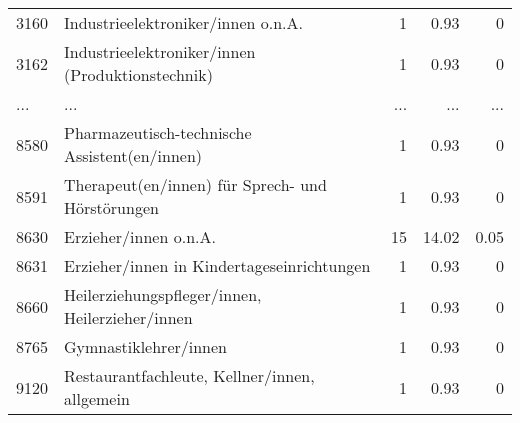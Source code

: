 \begin{longtable}{lXrrr}
        3160 & \multicolumn{1}{X}{Industrieelektroniker/innen o.n.A.} & %
          \num{1} &
          \num[round-mode=places,round-precision=2]{0,93} &
          \num[round-mode=places,round-precision=2]{0} \\
        3162 & \multicolumn{1}{X}{Industrieelektroniker/innen (Produktionstechnik)} & %
          \num{1} &
          \num[round-mode=places,round-precision=2]{0,93} &
          \num[round-mode=places,round-precision=2]{0} \\
       ... & ... & ... & ... & ... \\
        8580 & \multicolumn{1}{X}{Pharmazeutisch-technische Assistent(en/innen)} & %
          \num{1} &
          \num[round-mode=places,round-precision=2]{0,93} &
          \num[round-mode=places,round-precision=2]{0} \\

        8591 & \multicolumn{1}{X}{Therapeut(en/innen) für Sprech- und Hörstörungen} & %
          \num{1} &
          \num[round-mode=places,round-precision=2]{0,93} &
          \num[round-mode=places,round-precision=2]{0} \\

        8630 & \multicolumn{1}{X}{Erzieher/innen o.n.A.} & %
          \num{15} &
          \num[round-mode=places,round-precision=2]{14,02} &
          \num[round-mode=places,round-precision=2]{0,05} \\

        8631 & \multicolumn{1}{X}{Erzieher/innen in Kindertageseinrichtungen} & %
          \num{1} &
          \num[round-mode=places,round-precision=2]{0,93} &
          \num[round-mode=places,round-precision=2]{0} \\

        8660 & \multicolumn{1}{X}{Heilerziehungspfleger/innen, Heilerzieher/innen} & %
          \num{1} &
          \num[round-mode=places,round-precision=2]{0,93} &
          \num[round-mode=places,round-precision=2]{0} \\

        8765 & \multicolumn{1}{X}{Gymnastiklehrer/innen} & %
          \num{1} &
          \num[round-mode=places,round-precision=2]{0,93} &
          \num[round-mode=places,round-precision=2]{0} \\

        9120 & \multicolumn{1}{X}{Restaurantfachleute, Kellner/innen, allgemein} & %
          \num{1} &
          \num[round-mode=places,round-precision=2]{0,93} &
          \num[round-mode=places,round-precision=2]{0} \\


\end{longtable}
